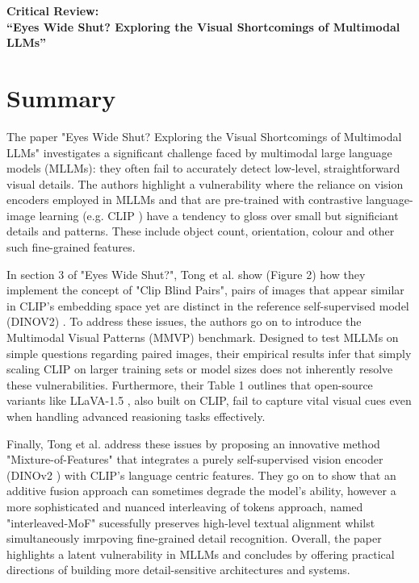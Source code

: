 \documentclass[11pt]{article}
\begin{document}
\thispagestyle{fancy}

\begin{center}
    {\large \textbf{Critical Review:}\\
    \textbf{``Eyes Wide Shut? Exploring the Visual Shortcomings of Multimodal LLMs''}}
\end{center}

\section*{Summary}

The paper "Eyes Wide Shut? Exploring the Visual Shortcomings of Multimodal LLMs" \cite{Tong2024CVPR} investigates a significant challenge faced by multimodal large language models (MLLMs): they often fail to accurately detect low-level, straightforward visual details.
The authors highlight a vulnerability where the reliance on vision encoders employed in MLLMs and that are pre-trained with contrastive language-image learning (e.g. CLIP \cite{Radford2021ICML}) have a tendency to gloss over small but significiant details and patterns. These include object count, orientation, colour and other such fine-grained features.

In section 3 of "Eyes Wide Shut?", Tong et al. show (Figure 2) how they implement the concept of "Clip Blind Pairs", pairs of images that appear similar in CLIP's embedding space yet are distinct in the reference self-supervised model (DINOV2) \cite{Oquab2023DINOv2}.
To address these issues, the authors go on to introduce the Multimodal Visual Patterns (MMVP) benchmark. Designed to test MLLMs on simple questions regarding paired images, their empirical results infer that simply scaling CLIP on larger training sets or model sizes does not inherently resolve these vulnerabilities.
Furthermore, their Table 1 outlines that open-source variants like LLaVA-1.5 \cite{Liu2023Arxiv_LLaVA15}, also built on CLIP, fail to capture vital visual cues even when handling advanced reasioning tasks effectively.

Finally, Tong et al. address these issues by proposing an innovative method "Mixture-of-Features" that integrates a purely self-supervised vision encoder (DINOv2 \cite{Oquab2023DINOv2}) with CLIP's language centric features. They go on to show that an additive fusion approach can sometimes degrade the model's ability, however a more sophisticated and nuanced
interleaving of tokens approach, named "interleaved-MoF" sucessfully preserves high-level textual alignment whilst simultaneously imrpoving fine-grained detail recognition. Overall, the paper highlights a latent vulnerability in MLLMs and concludes by offering practical directions of building more detail-sensitive architectures and systems.
\end{document}
